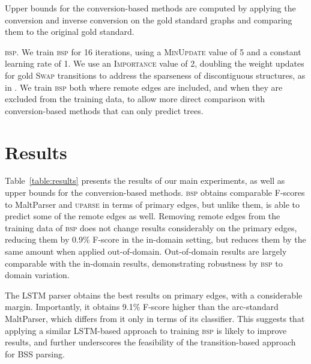\documentclass[11pt]{article}
\makeatletter
\newcommand{\tabref}[1]{Table~\ref{#1}}
\renewcommand{\paragraph}{
  \@startsection{paragraph}{4}
  {\z@}{.5ex \@plus .5ex \@minus .2ex}{-1em}
  {\normalfont\normalsize\bfseries}
}
\makeatother
\begin{document}


Upper bounds for the conversion-based methods are computed by applying
the conversion and inverse conversion on the gold standard
graphs and comparing them to the original gold standard.

\paragraph{\textsc{bsp}.}
We train \textsc{bsp} for 16 iterations, using a \textsc{MinUpdate} value of 5 and a constant learning rate of 1.
We use an \textsc{Importance} value of 2, doubling the weight updates
for gold \textsc{Swap} transitions to address the sparseness
of discontiguous structures, as in \cite{maier2015discontinuous}.
We train \textsc{bsp} both where remote edges
are included, and when they are excluded from the training data, to allow
more direct comparison with conversion-based methods that can only
predict trees.

\section{Results}\label{sec:results}

\tabref{table:results} presents the results of our main experiments, as well as
upper bounds for the conversion-based methods.
\textsc{bsp} obtains comparable F-scores to MaltParser and \textsc{uparse}
in terms of primary edges, but unlike them, is able to predict some
of the remote edges as well. 
Removing remote edges from the training data of \textsc{bsp} does not
change results considerably on the primary edges,
reducing them by 0.9\% F-score in the in-domain setting, but reduces
them by the same amount when applied out-of-domain. 
Out-of-domain results are largely comparable with the in-domain
results, demonstrating robustness by \textsc{bsp}
to domain variation.

The LSTM parser obtains the best results on primary edges,
with a considerable margin. Importantly, it obtains 9.1\%
F-score higher than the arc-standard MaltParser, which
differs from it only in terms of its classifier.
This suggests that applying a similar LSTM-based approach to
training \textsc{bsp} is likely to improve results,
and further underscores the feasibility of the transition-based
approach for BSS parsing. 
\end{document}
